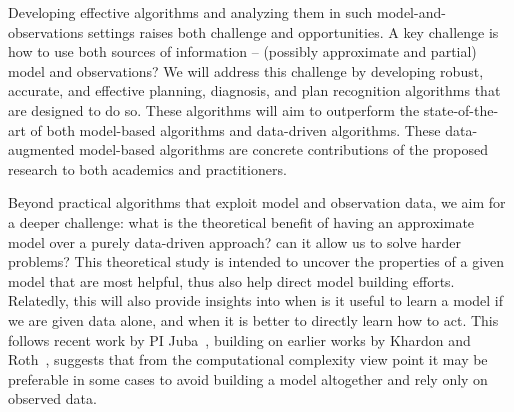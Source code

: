 Developing effective algorithms and analyzing them in such model-and-observations settings raises both challenge and opportunities. A key challenge is how to use both sources of information -- (possibly approximate and partial) model and observations? 
We will address this challenge by developing robust, accurate, and effective planning, diagnosis, and plan recognition algorithms that are designed to do so. 
These algorithms will aim to outperform the state-of-the-art of both model-based algorithms and data-driven algorithms. These data-augmented model-based algorithms are concrete contributions of the proposed research to both academics and practitioners. 

Beyond practical algorithms that exploit model and observation data, we aim for a deeper challenge: what is the theoretical benefit of having an approximate model over a purely data-driven approach? can it allow us to solve harder problems? 
This theoretical study is intended to uncover the properties of a given model that are most helpful, thus also help direct model building efforts. Relatedly, this will also provide insights into when is it useful to learn a model if we are given data alone, and when it is better to directly learn how to act. 
This follows recent work by PI Juba~\cite{juba2013ijcai,juba2015itcs}, building on earlier works by Khardon and Roth~\cite{khardon1997l2r}, suggests that from the computational complexity view point it may be preferable in some cases to avoid building a model altogether and rely only on observed data.  %


